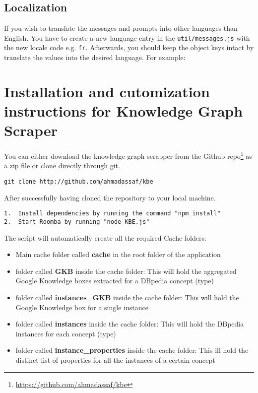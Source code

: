 \subsection{Localization}

If you wish to translate the messages and prompts into other languages than English. You have to create a new language entry in the \texttt{util/messages.js} with the new locale code e.g. \texttt{fr}. Afterwards, you should keep the object keys intact by translate the values into the desired language. For example:



\section{Installation and cutomization instructions for Knowledge Graph Scraper}
\label{section:installation_KGB}

You can either download the knowledge graph scrapper from the Github repo\footnote{\url{https://github.com/ahmadassaf/kbe}} as a zip file or clone directly through git.

\begin{verbatim}
git clone http://github.com/ahmadassaf/kbe
\end{verbatim}

After successfully having cloned the repository to your local machine.
\begin{verbatim}
1.	Install dependencies by running the command "npm install"
2.	Start Roomba by running "node KBE.js"
\end{verbatim}

The script will automatically create all the required Cache folders:

\begin{itemize}
	\item Main cache folder called \textbf{cache} in the root folder of the application
	\item folder called \textbf{GKB} inside the cache folder: This will hold the aggregated Google Knowledge boxes extracted for a DBpedia concept (type)
	\item folder called \textbf{instances\_GKB} inside the cache folder: This will hold the Google Knowledge box for a single instance
	\item folder called \textbf{instances} inside the cache folder: This will hold the DBpedia instances for each concept (type)
	\item folder called \textbf{instance\_properties} inside the cache folder: This ill hold the distinct list of properties for all the instances of a certain concept
\end{itemize}

